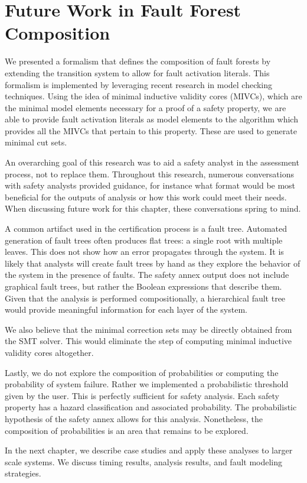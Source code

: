 \section{Future Work in Fault Forest Composition}
We presented a formalism that defines the composition of fault forests by extending the transition system to allow for fault activation literals. This formalism is implemented by leveraging recent research in model checking techniques. Using the idea of minimal inductive validity cores (MIVCs), which are the minimal model elements necessary for a proof of a safety property, we are able to provide fault activation literals as model elements to the \aivcalg algorithm which provides all the MIVCs that pertain to this property. These are used to generate minimal cut sets. 

An overarching goal of this research was to aid a safety analyst in the assessment process, not to replace them. Throughout this research, numerous conversations with safety analysts provided guidance, for instance what format would be most beneficial for the outputs of analysis or how this work could meet their needs. When discussing future work for this chapter, these conversations spring to mind. 

A common artifact used in the certification process is a fault tree. Automated generation of fault trees often produces flat trees: a single root with multiple leaves. This does not show how an error propagates through the system. It is likely that analysts will create fault trees by hand as they explore the behavior of the system in the presence of faults. The safety annex output does not include graphical fault trees, but rather the Boolean expressions that describe them. Given that the analysis is performed compositionally, a hierarchical fault tree would provide meaningful information for each layer of the system. 

We also believe that the minimal correction sets may be directly obtained from the SMT solver. This would eliminate the step of computing minimal inductive validity cores altogether. 

Lastly, we do not explore the composition of probabilities or computing the probability of system failure. Rather we implemented a probabilistic threshold given by the user. This is perfectly sufficient for safety analysis. Each safety property has a hazard classification and associated probability. The probabilistic hypothesis of the safety annex allows for this analysis. Nonetheless, the composition of probabilities is an area that remains to be explored. 

In the next chapter, we describe case studies and apply these analyses to larger scale systems. We discuss timing results, analysis results, and fault modeling strategies. 